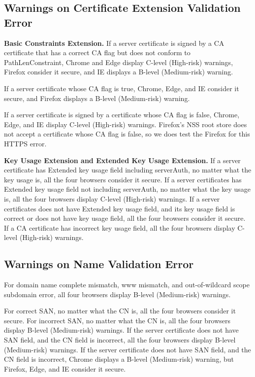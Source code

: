 \subsection{Warnings on Certificate Extension Validation Error}

\textbf{Basic Constraints Extension.}
    If a server certificate is signed by a CA certificate that has a correct CA flag but does not conform to PathLenConstraint,
    Chrome and Edge display C-level (High-risk) warnings,
    Firefox consider it secure, and IE displays a B-level (Medium-risk) warning.

    If a server certificate whose CA flag is true,
    Chrome, Edge, and IE consider it secure,
    and Firefox displays a B-level (Medium-risk) warning.

    If a server certificate is signed by a certificate whose CA flag is false,
     Chrome, Edge, and IE display C-level (High-risk) warnings.
     Firefox's NSS root store does not accept a certificate whose CA flag is false, so we does test the Firefox for this HTTPS error.

\textbf{Key Usage Extension and Extended Key Usage Extension.}
    If a server certificate has Extended key usage field including serverAuth, no matter what the key usage is,
        all the four browsers consider it secure.
    If a server certificates has Extended key usage field not including serverAuth, no matter what the key usage is,
        all the four browsers display C-level (High-risk) warnings.
    If a server certificates does not have Extended key usage field, and its key usage field is correct or does not have key usage field,
        all the four browsers consider it secure.
    If a CA certificate has incorrect key usage field,
        all the four browsers display C-level (High-risk) warnings.

\subsection{Warnings on Name Validation Error}
    For domain name complete mismatch, www mismatch, and out-of-wildcard scope subdomain error,
    all four browsers display B-level (Medium-risk) warnings.

    For correct SAN, no matter what the CN is, all the four browsers consider it secure.
    For incorrect SAN, no matter what the CN is, all the four browsers display B-level (Medium-risk) warnings.
    If the server certificate does not have SAN field, and the CN field is incorrect, all the four browsers display B-level (Medium-risk) warnings.
    If the server certificate does not have SAN field, and the CN field is incorrect,
    Chrome displays a B-level (Medium-risk) warning,
            but Firefox, Edge, and IE consider it secure.


